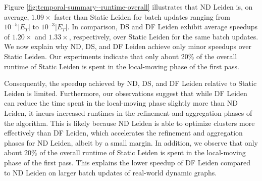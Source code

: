 Figure \ref{fig:temporal-summary--runtime-overall} illustrates that ND Leiden is, on average, $1.09\times$ faster than Static Leiden for batch updates ranging from $10^{-5}|E_T|$ to $10^{-3}|E_T|$. In comparison, DS and DF Leiden exhibit average speedups of $1.20\times$ and $1.33\times$, respectively, over Static Leiden for the same batch updates. We now explain why ND, DS, and DF Leiden achieve only minor speedups over Static Leiden. Our experiments indicate that only about $20\%$ of the overall runtime of Static Leiden is spent in the local-moving phase of the first pass. Consequently, the speedup achieved by ND, DS, and DF Leiden relative to Static Leiden is limited. Furthermore, our observations suggest that while DF Leiden can reduce the time spent in the local-moving phase slightly more than ND Leiden, it incurs increased runtimes in the refinement and aggregation phases of the algorithm. This is likely because ND Leiden is able to optimize clusters more effectively than DF Leiden, which accelerates the refinement and aggregation phases for ND Leiden, albeit by a small margin. In addition, we observe that only about $20\%$ of the overall runtime of Static Leiden is spent in the local-moving phase of the first pass. This explains the lower speedup of DF Leiden compared to ND Leiden on larger batch updates of real-world dynamic graphs.


